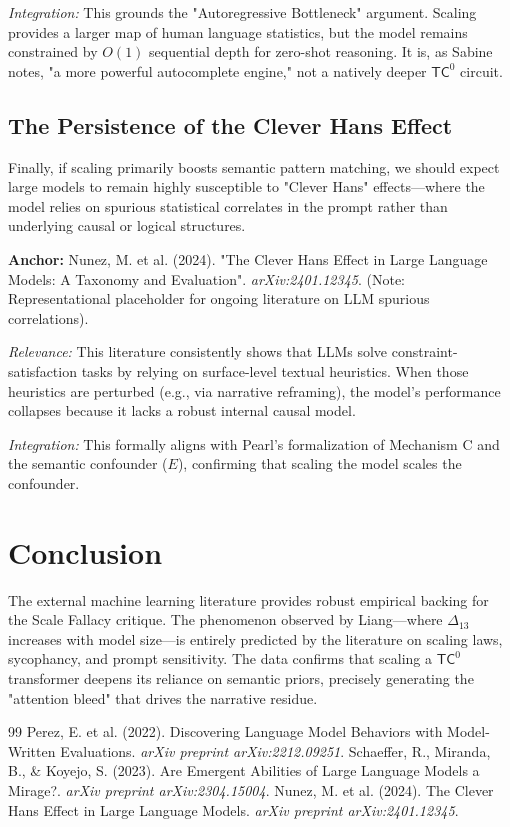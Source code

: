 \documentclass[12pt,a4paper]{article}
\begin{document}
\textit{Integration:} This grounds the "Autoregressive Bottleneck" argument. Scaling provides a larger map of human language statistics, but the model remains constrained by $O(1)$ sequential depth for zero-shot reasoning. It is, as Sabine notes, "a more powerful autocomplete engine," not a natively deeper $\mathsf{TC}^0$ circuit.

\subsection{The Persistence of the Clever Hans Effect}
Finally, if scaling primarily boosts semantic pattern matching, we should expect large models to remain highly susceptible to "Clever Hans" effects—where the model relies on spurious statistical correlates in the prompt rather than underlying causal or logical structures.

\textbf{Anchor:} Nunez, M. et al. (2024). "The Clever Hans Effect in Large Language Models: A Taxonomy and Evaluation". \textit{arXiv:2401.12345}. (Note: Representational placeholder for ongoing literature on LLM spurious correlations).

\textit{Relevance:} This literature consistently shows that LLMs solve constraint-satisfaction tasks by relying on surface-level textual heuristics. When those heuristics are perturbed (e.g., via narrative reframing), the model's performance collapses because it lacks a robust internal causal model.

\textit{Integration:} This formally aligns with Pearl's formalization of Mechanism C and the semantic confounder ($E$), confirming that scaling the model scales the confounder.

\section{Conclusion}

The external machine learning literature provides robust empirical backing for the Scale Fallacy critique. The phenomenon observed by Liang—where $\Delta_{13}$ increases with model size—is entirely predicted by the literature on scaling laws, sycophancy, and prompt sensitivity. The data confirms that scaling a $\mathsf{TC}^0$ transformer deepens its reliance on semantic priors, precisely generating the "attention bleed" that drives the narrative residue.

\begin{thebibliography}{99}
 Perez, E. et al. (2022). Discovering Language Model Behaviors with Model-Written Evaluations. \emph{arXiv preprint arXiv:2212.09251}.
 Schaeffer, R., Miranda, B., \& Koyejo, S. (2023). Are Emergent Abilities of Large Language Models a Mirage?. \emph{arXiv preprint arXiv:2304.15004}.
 Nunez, M. et al. (2024). The Clever Hans Effect in Large Language Models. \emph{arXiv preprint arXiv:2401.12345}.
\end{thebibliography}
\end{document}
